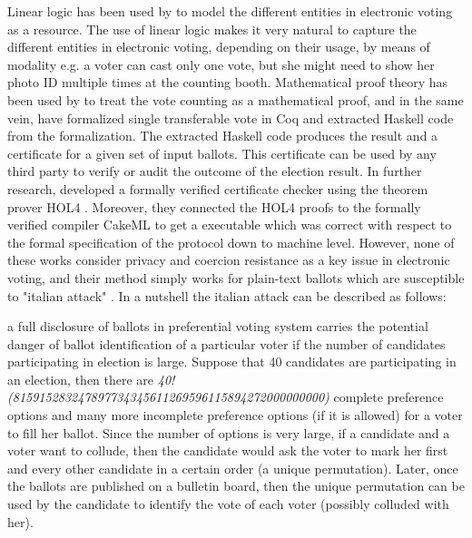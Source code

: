  \noindent
 Linear logic \citep{GIRARD19871} has been used by \citep{DeYoung:2012:LLV} to model the different entities in electronic voting as a resource. 
 The use of linear logic makes it very natural to capture the different entities in electronic voting,  
 depending on their usage, by means of modality e.g. a voter can cast only one vote, but she might 
 need to show her photo ID multiple times at the counting booth. Mathematical proof theory has 
 been used by \citep{Pattinson:2015:VCM}  to treat the vote counting as a mathematical 
 proof, and in the same vein, 
 \citep{Ghale:2017:FVS} have formalized single transferable vote in Coq and 
 extracted Haskell code from the formalization. The extracted Haskell code produces the result 
 and a certificate for a given set of input ballots. This certificate can be used by any third party to verify 
 or audit the outcome of the election result.  In further research, \citep{10.1007/978-3-030-03592-1_5} 
 developed a formally verified certificate checker using the theorem prover HOL4 \citep{Slind:2008:BOH:1459784.1459792}. 
 Moreover, they connected the HOL4 proofs to the formally verified compiler CakeML \citep{Kumar:2014:CVI} 
 to get a executable which was correct with respect to the formal specification of the protocol
 down to machine level. 
 However, none of these works consider privacy and coercion resistance as a key 
 issue in electronic voting, and their method simply works for plain-text ballots which are  susceptible to 
 "italian attack"  \citep{Otten}   \citep{Benaloh:2009:SSC}.  In a nutshell the italian attack can be described 
 as follows: 
 \begin{displayquote}
 a full disclosure of 
 ballots in preferential voting system carries the potential danger of  ballot identification of 
 a particular voter if the number of candidates participating in election is large. Suppose
 that 40 candidates are participating in an election, then there are \textit{40!
 (815915283247897734345611269596115894272000000000)} complete 
 preference options and many more incomplete  preference options  (if it is allowed) for a voter to 
 fill her ballot. Since the number of options is very large, if a candidate and a voter want 
 to collude, then the candidate would ask the voter to mark her first and every other candidate 
 in a certain order (a unique permutation). Later, once the ballots are published 
 on a bulletin board, then the unique permutation can be used by the candidate to 
 identify the vote of each voter (possibly colluded with her).  
 \end{displayquote}
 

